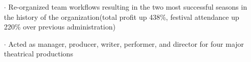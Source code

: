 \documentclass[a4paper, oneside, final]{scrartcl} %
\newcommand{\gray}{\rowcolor[gray]{.90}} %
\begin{document}
\begin{center}
\begin{itemize}
\item[$\cdot$] Re-organized team workflows resulting in the two most successful seasons in the history of the organization(total profit up 438\%, festival attendance up 220\% over previous administration)\\
\item[$\cdot$] Acted as manager, producer, writer, performer, and director for four major theatrical productions
\end{itemize}

\vspace{-0.05 cm}

%

%


\end{center}
\end{document}
